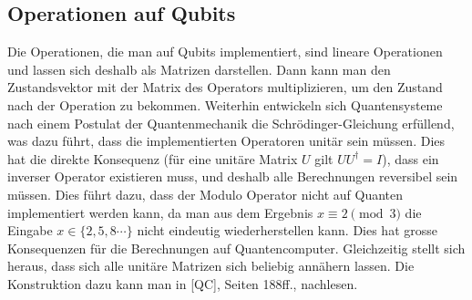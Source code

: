 
\subsection{Operationen auf Qubits}
Die Operationen, die man auf Qubits implementiert, sind lineare Operationen und lassen sich deshalb als Matrizen darstellen. Dann kann man den Zustandsvektor mit der Matrix des Operators multiplizieren, um den Zustand nach der Operation zu bekommen. Weiterhin entwickeln sich Quantensysteme nach einem Postulat der Quantenmechanik die Schrödinger-Gleichung erfüllend, was dazu führt, dass die implementierten Operatoren unitär sein müssen. Dies hat die direkte Konsequenz (für eine unitäre Matrix $U$ gilt $UU^{\dagger} = I$), dass ein inverser Operator existieren muss, und deshalb alle Berechnungen reversibel sein müssen. Dies führt dazu, dass der Modulo Operator nicht auf Quanten implementiert werden kann, da man aus dem Ergebnis $x \equiv 2 \pmod{3}$ die Eingabe $x \in \{2, 5, 8\cdots\}$ nicht eindeutig wiederherstellen kann. Dies hat grosse Konsequenzen für die Berechnungen auf Quantencomputer. Gleichzeitig stellt sich heraus, dass sich alle unitäre Matrizen sich beliebig annähern lassen. Die Konstruktion dazu kann man in [QC], Seiten 188ff., nachlesen.

